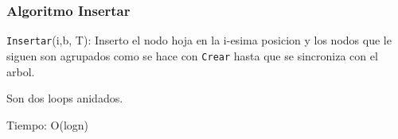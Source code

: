 \documentclass[10pt,handout]{beamer}
\begin{document}
\begin{frame}
  \pause

\end{frame}


\begin{frame}
\frametitle{Algoritmo Insertar}
  \texttt{Insertar}(i,b, T): Inserto el nodo hoja en la i-esima posicion y los nodos que le siguen son agrupados
  como se hace con  \texttt{Crear} hasta que se sincroniza con el arbol.

  Son dos loops anidados.

  Tiempo: O(logn)
\end{frame}



\end{document}
